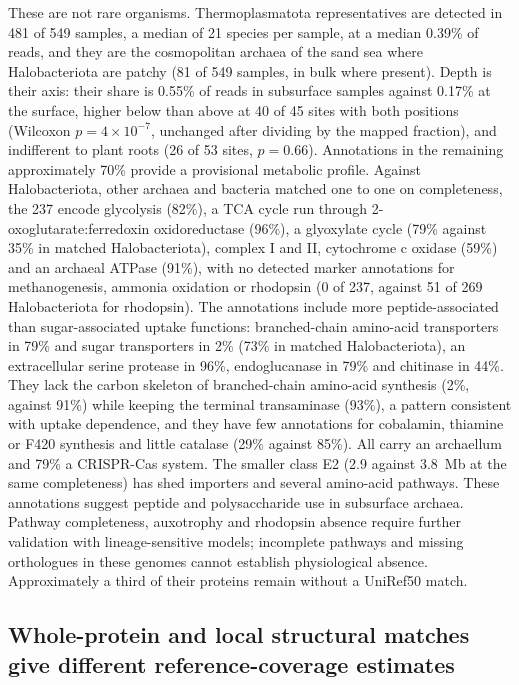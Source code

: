 \documentclass[11pt]{article}
\begin{document}
These are not rare organisms. Thermoplasmatota representatives are detected in 481 of 549 samples,
a median of 21 species per sample, at a median 0.39\% of reads, and they are the cosmopolitan archaea
of the sand sea where Halobacteriota are patchy (81 of 549 samples, in bulk where present). Depth is
their axis: their share is 0.55\% of reads in subsurface samples against 0.17\% at the surface, higher
below than above at 40 of 45 sites with both positions (Wilcoxon $p = 4 \times 10^{-7}$, unchanged
after dividing by the mapped fraction), and indifferent to plant roots (26 of 53 sites, $p = 0.66$).
Annotations in the remaining approximately 70\% provide a provisional metabolic profile. Against Halobacteriota, other archaea and
bacteria matched one to one on completeness, the 237 encode glycolysis (82\%), a TCA cycle run through
2-oxoglutarate:ferredoxin oxidoreductase (96\%), a glyoxylate cycle (79\% against 35\% in matched
Halobacteriota), complex I and II, cytochrome c oxidase (59\%) and an archaeal ATPase (91\%), with no detected marker annotations for
methanogenesis, ammonia oxidation or rhodopsin (0 of 237, against 51 of 269 Halobacteriota for
rhodopsin). The annotations include more peptide-associated than sugar-associated uptake functions: branched-chain amino-acid
transporters in 79\% and sugar transporters in 2\% (73\% in matched Halobacteriota), an extracellular
serine protease in 96\%, endoglucanase in 79\% and chitinase in 44\%. They lack the carbon skeleton of
branched-chain amino-acid synthesis (2\%, against 91\%) while keeping the terminal transaminase
(93\%), a pattern consistent with uptake dependence, and they have few annotations for cobalamin, thiamine or F420
synthesis and little catalase (29\% against 85\%). All carry an archaellum and 79\% a CRISPR-Cas
system. The smaller class E2 (2.9 against 3.8~Mb at the same completeness) has shed importers and
several amino-acid pathways. These annotations suggest peptide and polysaccharide use in subsurface archaea. Pathway
completeness, auxotrophy and rhodopsin absence require further validation with lineage-sensitive
models; incomplete pathways and missing orthologues in these genomes cannot establish physiological
absence. Approximately a third of their proteins remain without a UniRef50 match.

\subsection*{Whole-protein and local structural matches give different reference-coverage estimates}
\end{document}
